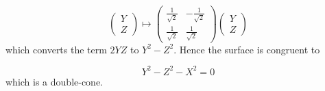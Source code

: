 \documentclass[12pt]{article}
\begin{document}
$$\left(\begin{matrix}
Y\\
Z\end{matrix}\right) \mapsto
\left(\begin{matrix}
\frac{1}{\sqrt{2}} & -\frac{1}{\sqrt{2}} \\
\frac{1}{\sqrt{2}} & \frac{1}{\sqrt{2}}\end{matrix}
\right) \left(\begin{matrix}
Y\\Z\end{matrix}\right)$$
which converts the term $2YZ$ to $Y^2 - Z^2$.  Hence the surface is
congruent to 

$$Y^2 - Z^2 - X^2 = 0$$
which is a double-cone.
\end{document}

